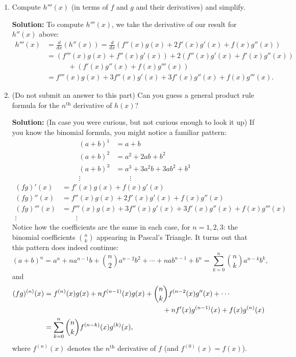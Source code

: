\documentclass[letterpaper,12pt]{article}
\begin{document}
\begin{enumerate}
\begin{enumerate}
\item Compute $h'''(x)$ (in terms of $f$ and $g$ and their derivatives) and simplify.

\medskip

\textbf{Solution:} To compute $h'''(x)$, we take the derivative of our result for $h''(x)$ above:
\begin{align*}
h'''(x) & = \frac{d}{dx}(h''(x))  = \frac{d}{dx}(f''(x)g(x) +2f'(x)g'(x)+f(x)g''(x))\\
 & = (f'''(x)g(x) +f''(x)g'(x))+2(f''(x)g'(x)+f'(x)g''(x))\\
 & \quad\quad\quad +(f'(x)g''(x)+f(x)g'''(x))\\
 & = f'''(x)g(x)+3f''(x)g'(x)+3f'(x)g''(x)+f(x)g'''(x).
\end{align*}

\item (Do not submit an answer to this part) Can you guess a general product rule formula for the $n^{\text{th}}$ derivative of $h(x)$?

\medskip

\textbf{Solution:} (In case you were curious, but not curious enough to look it up) If you know the binomial formula, you might notice a familiar pattern:
\begin{align*}
(a+b)^1 & = a + b \\
(a+b)^2 & = a^2+2ab+b^2 \\
(a+b)^3 & = a^3+3a^2b+3ab^2+b^3 \\
\vdots & \quad \quad \vdots 
\end{align*}
\begin{align*}
(fg)'(x) & = f'(x)g(x)+f(x)g'(x)\\
(fg)''(x) & = f''(x)g(x)+2f'(x)g'(x)+f(x)g''(x)\\
(fg)'''(x) &= f'''(x)g(x)+3f''(x)g'(x)+3f'(x)g''(x)+f(x)g'''(x)\\
\vdots & \quad \quad \vdots 
\end{align*}
Notice how the coefficients are the same in each case, for $n=1,2,3$: the binomial coefficients $\binom{n}{k}$ appearing in Pascal's Triangle. It turns out that this pattern does indeed continue:
\[
(a+b)^n = a^n+na^{n-1}b+\binom{n}{2}a^{n-2}b^2+\cdots + nab^{n-1}+b^n = \sum_{k=0}^n \binom{n}{k}a^{n-k}b^k,
\]
and
\begin{align*}
(fg)^{(n)}(x) &= f^{(n)}(x)g(x)+nf^{(n-1)}(x)g(x)+\binom{n}{k}f^{(n-2}(x)g''(x)+\cdots\\
& \hspace{2.3in} + nf'(x)g^{(n-1)}(x)+f(x)g^{(n)}(x)\\
& = \sum_{k=0}^n\binom{n}{k}f^{(n-k)}(x)g^{(k)}(x),
\end{align*}
where $f^{(n)}(x)$ denotes the $n^\textrm{th}$ derivative of $f$ (and $f^{(0)}(x) = f(x)$).


\end{enumerate}
\end{enumerate}
\end{document}
